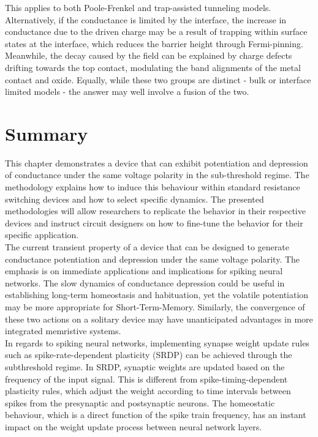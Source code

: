 \noindent This applies to both Poole-Frenkel and trap-assisted tunneling models. Alternatively, if the conductance is limited by the interface, the increase in conductance due to the driven charge may be a result of trapping within surface states at the interface, which reduces the barrier height through Fermi-pinning. Meanwhile, the decay caused by the field can be explained by charge defects drifting towards the top contact, modulating the band alignments of the metal contact and oxide. Equally, while these two groups are distinct - bulk or interface limited models - the answer may well involve a fusion of the two.

\section[Summary]{Summary}


\noindent This chapter demonstrates a device that can exhibit potentiation and depression of conductance under the same voltage polarity in the sub-threshold regime. The methodology explains how to induce this behaviour within standard resistance switching devices and how to select specific dynamics. The presented methodologies will allow researchers to replicate the behavior in their respective devices and instruct circuit designers on how to fine-tune the behavior for their specific application.\\

\noindent The current transient property of a device that can be designed to generate conductance potentiation and depression under the same voltage polarity. The emphasis is on immediate applications and implications for spiking neural networks. The slow dynamics of conductance depression could be useful in establishing long-term homeostasis and habituation, yet the volatile potentiation may be more appropriate for Short-Term-Memory. Similarly, the convergence of these two actions on a solitary device may have unanticipated advantages in more integrated memristive systems.\\

\noindent In regards to spiking neural networks, implementing synapse weight update rules such as spike-rate-dependent plasticity (SRDP) \cite{huang2019binary} can be achieved through the subthreshold regime. In SRDP, synaptic weights are updated based on the frequency of the input signal. This is different from spike-timing-dependent plasticity rules, which adjust the weight according to time intervals between spikes from the presynaptic and postsynaptic neurons. The homeostatic behaviour, which is a direct function of the spike train frequency, has an instant impact on the weight update process between neural network layers.\\

